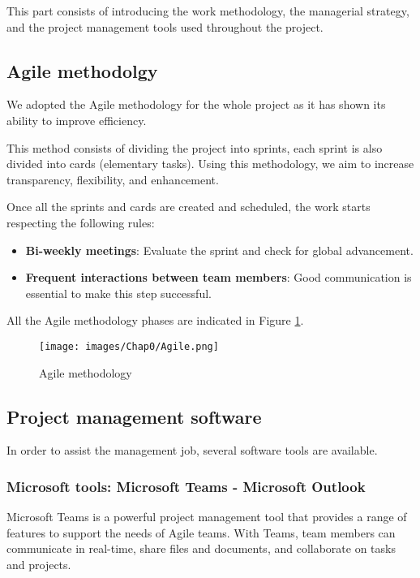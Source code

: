 This part consists of introducing the work methodology, the managerial strategy, and the project management tools used throughout the project.

\subsection{Agile methodolgy}

We adopted the Agile methodology for the whole project as it has shown its ability to improve efficiency.

This method consists of dividing the project into sprints, each sprint is also divided into cards (elementary tasks). Using this methodology, we aim to increase transparency, flexibility, and enhancement. \cite{R10}

Once all the sprints and cards are created and scheduled, the work starts respecting the following rules:
\begin{itemize}
    \item \textbf{Bi-weekly meetings}:  Evaluate the sprint and check for global advancement.
    \item \textbf{Frequent interactions between team members}: Good communication is essential to make this step successful.
\end{itemize}

All the Agile methodology phases are indicated in Figure \ref{Agile}.

\begin{figure}[H]
\begin{center}
\texttt{[image: images/Chap0/Agile.png]}\\
\caption{Agile methodology}
\label{Agile}
\end{center}
\end{figure} 

\subsection{Project management software}

In order to assist the management job, several software tools are available.

\subsubsection{Microsoft tools: Microsoft Teams - Microsoft Outlook}

Microsoft Teams is a powerful project management tool that provides a range of features to support the needs of Agile teams. With Teams, team members can communicate in real-time, share files and documents, and collaborate on tasks and projects.


